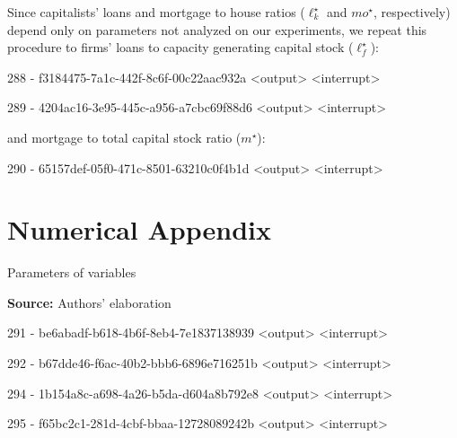 \documentclass[11pt]{article}
\begin{document}
Since capitalists' loans and mortgage to house ratios (\(\ell^{\star}_{k}\) and \(mo^{\star}\), respectively) depend only on parameters not analyzed on our experiments, we repeat this  procedure to firms' loans to capacity generating capital stock (\(\ell^{\star}_f\)):


288 - f3184475-7a1c-442f-8c6f-00c22aac932a <output> <interrupt>

289 - 4204ac16-3e95-445c-a956-a7cbc69f88d6 <output> <interrupt>

and mortgage to total capital stock ratio (\(m^{\star}\)):

290 - 65157def-05f0-471c-8501-63210c0f4b1d <output> <interrupt>




\section{Numerical Appendix}
\label{sec:org0ff5537}
\label{append:Data}

\begin{table}[H]
\caption{Parameters of variables}
\centering
\label{tab:param}

\caption*{\textbf{Source:} Authors' elaboration}
\end{table}


291 - be6abadf-b618-4b6f-8eb4-7e1837138939 <output> <interrupt>


292 - b67dde46-f6ac-40b2-bbb6-6896e716251b <output> <interrupt>


294 - 1b154a8c-a698-4a26-b5da-d604a8b792e8 <output> <interrupt>


295 - f65bc2c1-281d-4cbf-bbaa-12728089242b <output> <interrupt>
\end{document}
